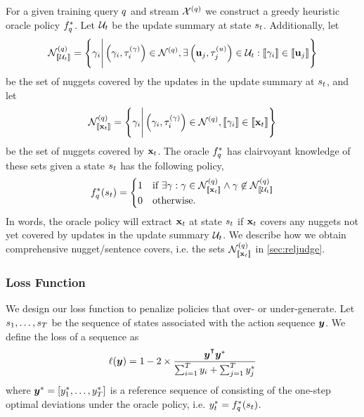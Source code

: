 For a given training query $q$ and stream $\mathcal{X}^{(q)}$ we
construct a greedy heuristic oracle policy $f^*_{q}$.  Let
$\mathcal{U}_t$ be the update summary at state $s_t$. Additionally,
let
\[
\mathcal{N}^{(q)}_{\left\llbracket \mathcal{U}_t \right\rrbracket} = 
\left\{\gamma_i \Bigg\vert
        \left(\gamma_i,\tau^{(\gamma)}_i\right) \in \mathcal{N}^{(q)},
         \exists \left(\mathbf{u}_j, \tau^{(u)}_j\right) \in \mathcal{U}_t : \left\llbracket \gamma_i \right\rrbracket \in
        \left\llbracket \mathbf{u}_j \right\rrbracket
       \right\}
\]
be the set of nuggets covered by the updates in the update summary at
$s_t$, and let
\[
\mathcal{N}^{(q)}_{\left\llbracket \mathbf{x}_t \right\rrbracket} = 
\left\{\gamma_i \Bigg\vert
        \left(\gamma_i,\tau^{(\gamma)}_i\right) \in \mathcal{N}^{(q)},
        \left\llbracket \gamma_i \right\rrbracket \in
        \left\llbracket \mathbf{x}_t \right\rrbracket
       \right\}
\]
be the set of nuggets covered by $\mathbf{x}_t$.  The oracle $f^*_{q}$
has clairvoyant knowledge of these sets given a state $s_t$ has the
following policy,
\[
    f^*_{q}(s_t) = \begin{cases} 
        1 & \textrm{if }  
        \exists \gamma : \gamma \in \mathcal{N}^{(q)}_{\left\llbracket \mathbf{x}_t \right\rrbracket} \wedge 
   \gamma \not\in \mathcal{N}^{(q)}_{\left\llbracket \mathcal{U}_t \right\rrbracket }
     \\
     0 & \textrm{otherwise.} \end{cases}
\]
In words, the oracle policy will extract $\mathbf{x}_t$ at state $s_t$
if $\mathbf{x}_t$ covers any nuggets not yet covered by updates in the
update summary $\mathcal{U}_t$. We describe how we obtain comprehensive
nugget/sentence covers, i.e. the sets $\mathcal{N}^{(q)}_{\left\llbracket \mathbf{x}_t \right\rrbracket}$ in \autoref{sec:reljudge}.

\subsubsection{Loss Function}
We design our loss function to penalize policies that  over- or
under-generate. Let $s_1, \ldots, s_T$ be the sequence
of states associated with the action sequence $\boldsymbol{y}$.
We define the loss of a sequence as 
\begin{align*}
  \lossfunc(\bsals) = 1 - 2 \times 
    \frac{ \bsals^\T \bsals^* }{ \sum^T_{i=1} \bsal_i + \sum^T_{j=1}\bsal_j^* }
\end{align*}
where $\boldsymbol{y}^* = \left[y_1^*,\ldots, y_T^* \right]$
is a reference sequence of consisting of the one-step optimal deviations
under the oracle policy, i.e. $y_t^* = f^*_{q}(s_t)$.

